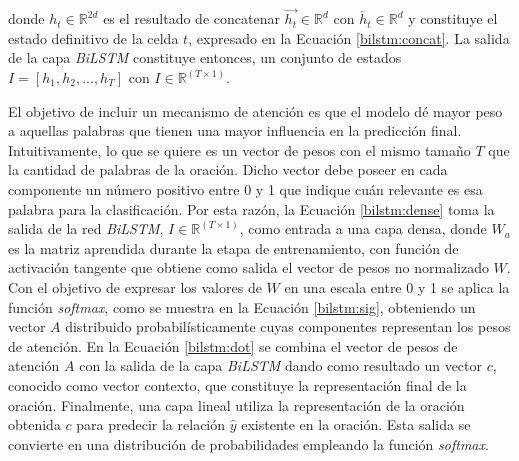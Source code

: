 donde $h_{t} \in {\mathbb{R}} ^{2d}$ es el resultado de concatenar $\overrightarrow{h_{t}} \in {\mathbb{R}} ^{d}$ con $\overleftarrow{h_{t}} \in {\mathbb{R}} ^{d}$ y constituye el estado definitivo de la celda $t$, expresado en la Ecuación \ref{bilstm:concat}. La salida de la capa \textit{BiLSTM} constituye entonces, un conjunto de estados $I  = {[h_{1}, h_{2}, ..., h_{T}]}$ con $I \in {\mathbb{R}}^{(T \times 1)}$.


El objetivo de incluir un mecanismo de atención es que el modelo dé mayor peso a aquellas palabras que tienen una mayor influencia en la predicción final. Intuitivamente, lo que se quiere es un vector de pesos con el mismo tamaño $T$ que la cantidad de palabras de la oración. Dicho vector debe poseer en cada componente un número positivo entre 0 y 1 que indique cuán relevante es esa palabra para la clasificación. Por esta razón, la Ecuación \ref{bilstm:dense} toma la salida de la red \textit{BiLSTM}, $I \in {\mathbb{R}}^{(T \times 1)}$, como entrada a una capa densa, donde $W_{a}$ es la matriz aprendida durante la etapa de entrenamiento, con función de activación tangente que obtiene como salida el vector de pesos no normalizado $W$. Con el objetivo de expresar los valores de $W$ en una escala entre 0 y 1 se aplica la función \textit{softmax}, como se muestra en la Ecuación \ref{bilstm:sig}, obteniendo un vector $A$ distribuido probabilísticamente cuyas componentes representan los pesos de atención. En la Ecuación \ref{bilstm:dot} se combina el vector de pesos de atención $A$ con la salida de la capa \textit{BiLSTM} dando como resultado un vector $c$, conocido como vector contexto, que constituye la representación final de la oración. Finalmente, una capa lineal utiliza la representación de la oración obtenida $c$ para predecir la relación $\hat{y}$ existente en la oración. Esta salida se convierte en una distribución de probabilidades empleando la función \textit{softmax}.